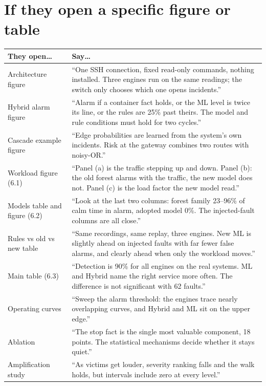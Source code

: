 \section{If they open a specific figure or table}
\begin{center}
\small
\begin{tabularx}{\textwidth}{>{\raggedright\arraybackslash}p{3.4cm}>{\raggedright\arraybackslash}X}
\toprule
\textbf{They open\ldots} & \textbf{Say\ldots}\\
\midrule
Architecture figure & ``One SSH connection, fixed read-only commands, nothing installed. Three engines run on the same readings; the switch only chooses which one opens incidents.''\\
Hybrid alarm figure & ``Alarm if a container fact holds, or the ML level is twice its line, or the rules are 25\% past theirs. The model and rule conditions must hold for two cycles.''\\
Cascade example figure & ``Edge probabilities are learned from the system's own incidents. Risk at the gateway combines two routes with noisy-OR.''\\
Workload figure (6.1) & ``Panel (a) is the traffic stepping up and down. Panel (b): the old forest alarms with the traffic, the new model does not. Panel (c) is the load factor the new model read.''\\
Models table and figure (6.2) & ``Look at the last two columns: forest family 23--96\% of calm time in alarm, adopted model 0\%. The injected-fault columns are all close.''\\
Rules vs old vs new table & ``Same recordings, same replay, three engines. New ML is slightly ahead on injected faults with far fewer false alarms, and clearly ahead when only the workload moves.''\\
Main table (6.3) & ``Detection is 90\% for all engines on the real systems. ML and Hybrid name the right service more often. The difference is not significant with 62 faults.''\\
Operating curves & ``Sweep the alarm threshold: the engines trace nearly overlapping curves, and Hybrid and ML sit on the upper edge.''\\
Ablation & ``The stop fact is the single most valuable component, 18 points. The statistical mechanisms decide whether it stays quiet.''\\
Amplification study & ``As victims get louder, severity ranking falls and the walk holds, but intervals include zero at every level.''\\

\end{tabularx}
\end{center}
